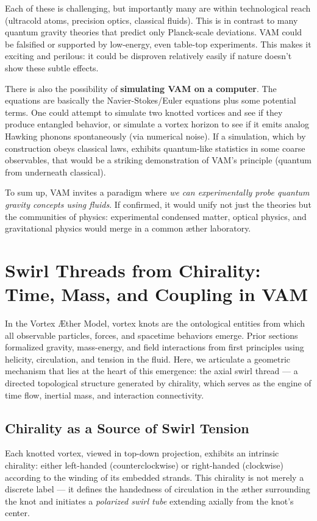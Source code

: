\documentclass[a4paper,12pt]{article}
\begin{document}
    Each of these is challenging, but importantly many are within technological reach (ultracold atoms, precision optics, classical fluids). This is in contrast to many quantum gravity theories that predict only Planck-scale deviations. VAM could be falsified or supported by low-energy, even table-top experiments. This makes it exciting and perilous: it could be disproven relatively easily if nature doesn’t show these subtle effects.

    There is also the possibility of \textbf{simulating VAM on a computer}. The equations are basically the Navier-Stokes/Euler equations plus some potential terms. One could attempt to simulate two knotted vortices and see if they produce entangled behavior, or simulate a vortex horizon to see if it emits analog Hawking phonons spontaneously (via numerical noise). If a simulation, which by construction obeys classical laws, exhibits quantum-like statistics in some coarse observables, that would be a striking demonstration of VAM’s principle (quantum from underneath classical).

    To sum up, VAM invites a paradigm where \emph{we can experimentally probe quantum gravity concepts using fluids}. If confirmed, it would unify not just the theories but the communities of physics: experimental condensed matter, optical physics, and gravitational physics would merge in a common æther laboratory.

\section{Swirl Threads from Chirality: Time, Mass, and Coupling in VAM}

    In the Vortex Æther Model, vortex knots are the ontological entities from which all observable particles, forces, and spacetime behaviors emerge. Prior sections formalized gravity, mass-energy, and field interactions from first principles using helicity, circulation, and tension in the fluid. Here, we articulate a geometric mechanism that lies at the heart of this emergence: the axial swirl thread — a directed topological structure generated by chirality, which serves as the engine of time flow, inertial mass, and interaction connectivity.

    \subsection{Chirality as a Source of Swirl Tension}

    Each knotted vortex, viewed in top-down projection, exhibits an intrinsic chirality: either left-handed (counterclockwise) or right-handed (clockwise) according to the winding of its embedded strands. This chirality is not merely a discrete label — it defines the handedness of circulation in the æther surrounding the knot and initiates a \textit{polarized swirl tube} extending axially from the knot’s center.
\end{document}
